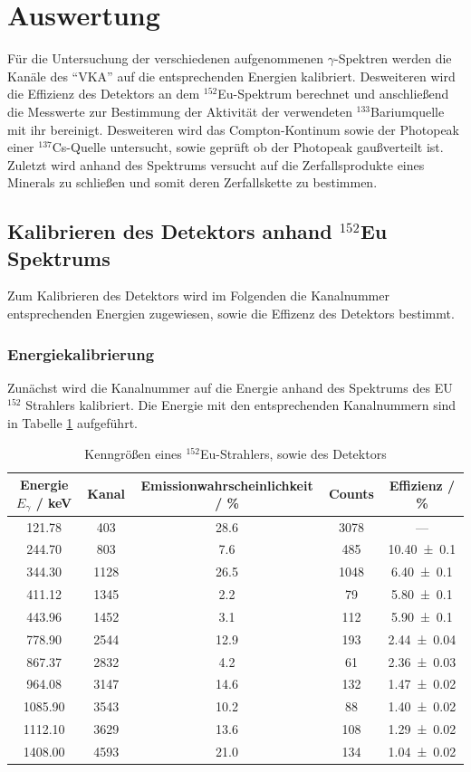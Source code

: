 \section{Auswertung}
\label{sec:Auswertung}
Für die Untersuchung der verschiedenen aufgenommenen $\gamma$-Spektren werden die Kanäle des ``VKA'' auf die entsprechenden Energien kalibriert. Desweiteren wird die Effizienz des Detektors an dem $^{152}$Eu-Spektrum berechnet und anschließend die Messwerte zur Bestimmung der Aktivität der verwendeten $^{133}$Bariumquelle mit ihr bereinigt. Desweiteren wird das Compton-Kontinum sowie der Photopeak einer $^{137}$Cs-Quelle untersucht, sowie geprüft ob der Photopeak gaußverteilt ist. Zuletzt wird anhand des Spektrums versucht auf die Zerfallsprodukte eines Minerals zu schließen und somit deren Zerfallskette zu bestimmen.


\subsection{Kalibrieren des Detektors anhand $^{152}$Eu Spektrums}
Zum Kalibrieren des Detektors wird im Folgenden die Kanalnummer entsprechenden Energien zugewiesen, sowie die Effizenz des Detektors bestimmt.


\subsubsection{Energiekalibrierung}
\label{sec:Kalb}
Zunächst wird die Kanalnummer auf die Energie anhand des Spektrums des EU$^{152}$ Strahlers kalibriert. Die Energie mit den entsprechenden Kanalnummern sind in Tabelle \ref{tab:CsSpekt} aufgeführt.

\begin{table}
  \centering
  \caption{Kenngrößen eines $^{152}$Eu-Strahlers, sowie des Detektors}
  \begin{tabular}{c | c c c c}
    \toprule
    Energie $E_{\gamma}$ / keV& Kanal & Emissionwahrscheinlichkeit / \% & Counts & Effizienz / \% \\
    \hline
    121.78	& 403	& 28.6	& 3078 	& ---	\\
    244.70	& 803	& 7.6	& 485 	& \num{10.40 +- 0.1}	\\
    344.30	& 1128	& 26.5	& 1048	& \num{6.40 +- 0.1}	\\
    411.12	& 1345	& 2.2	& 79	& \num{5.80 +- 0.1}	\\
    443.96	& 1452	& 3.1	& 112 	& \num{5.90 +- 0.1}	\\
    778.90	& 2544	& 12.9	& 193	& \num{2.44 +- 0.04}	\\
    867.37	& 2832	& 4.2	& 61	& \num{2.36 +- 0.03}	\\
    964.08	& 3147	& 14.6	& 132	& \num{1.47 +- 0.02}	\\
    1085.90	& 3543	& 10.2	& 88	& \num{1.40 +- 0.02}	\\
    1112.10	& 3629	& 13.6	& 108	& \num{1.29 +- 0.02}	\\
    1408.00	& 4593	& 21.0 	& 134	& \num{1.04 +- 0.02}	\\
    \bottomrule
  \end{tabular}
  \label{tab:CsSpekt}
\end{table}

